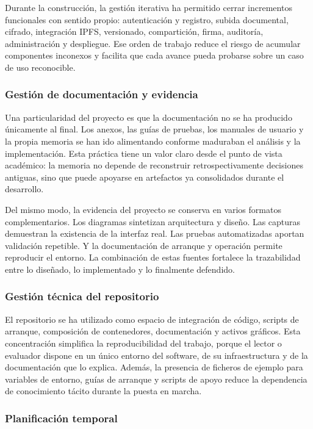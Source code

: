 \documentclass[11pt, a4paper]{article}
\begin{document}
Durante la construcción, la gestión iterativa ha permitido cerrar incrementos funcionales con sentido propio: autenticación y registro, subida documental, cifrado, integración IPFS, versionado, compartición, firma, auditoría, administración y despliegue. Ese orden de trabajo reduce el riesgo de acumular componentes inconexos y facilita que cada avance pueda probarse sobre un caso de uso reconocible.

\subsubsection{Gestión de documentación y evidencia}

Una particularidad del proyecto es que la documentación no se ha producido únicamente al final. Los anexos, las guías de pruebas, los manuales de usuario y la propia memoria se han ido alimentando conforme maduraban el análisis y la implementación. Esta práctica tiene un valor claro desde el punto de vista académico: la memoria no depende de reconstruir retrospectivamente decisiones antiguas, sino que puede apoyarse en artefactos ya consolidados durante el desarrollo.

Del mismo modo, la evidencia del proyecto se conserva en varios formatos complementarios. Los diagramas sintetizan arquitectura y diseño. Las capturas demuestran la existencia de la interfaz real. Las pruebas automatizadas aportan validación repetible. Y la documentación de arranque y operación permite reproducir el entorno. La combinación de estas fuentes fortalece la trazabilidad entre lo diseñado, lo implementado y lo finalmente defendido.

\subsubsection{Gestión técnica del repositorio}

El repositorio se ha utilizado como espacio de integración de código, scripts de arranque, composición de contenedores, documentación y activos gráficos. Esta concentración simplifica la reproducibilidad del trabajo, porque el lector o evaluador dispone en un único entorno del software, de su infraestructura y de la documentación que lo explica. Además, la presencia de ficheros de ejemplo para variables de entorno, guías de arranque y scripts de apoyo reduce la dependencia de conocimiento tácito durante la puesta en marcha.

\subsubsection{Planificación temporal}
\end{document}
